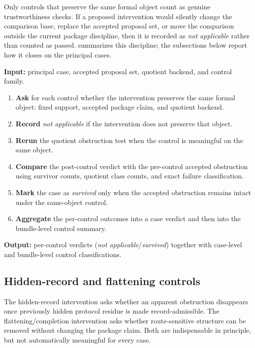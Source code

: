 \documentclass[11pt]{article}
\theoremstyle{definition}
\begin{document}
Only controls that preserve the same formal object count as genuine trustworthiness checks. If a proposed intervention would silently change the comparison base, replace the accepted proposal set, or move the comparison outside the current package discipline, then it is recorded as \emph{not applicable} rather than counted as passed.  summarizes this discipline; the subsections below report how it closes on the principal cases.

\begin{algorithm}[t]
    \caption{Flagship Control-Bundle Evaluation}
    \label{alg:control-bundle-workflow}
    \small
    \textbf{Input:} principal case, accepted proposal set, quotient backend, and control family. \par\smallskip
    \begin{enumerate}[leftmargin=1.8em,label=\arabic*.,itemsep=2pt,topsep=3pt]
        \item \textbf{Ask} for each control whether the intervention preserves the same formal object: fixed support, accepted package claim, and quotient backend.
        \item \textbf{Record} \emph{not applicable} if the intervention does not preserve that object.
        \item \textbf{Rerun} the quotient obstruction test when the control is meaningful on the same object.
        \item \textbf{Compare} the post-control verdict with the pre-control accepted obstruction using survivor counts, quotient class counts, and exact failure classification.
        \item \textbf{Mark} the case as \emph{survived} only when the accepted obstruction remains intact under the same-object control.
        \item \textbf{Aggregate} the per-control outcomes into a case verdict and then into the bundle-level control summary.
    \end{enumerate}
    \textbf{Output:} per-control verdicts (\emph{not applicable}/\emph{survived}) together with case-level and bundle-level control classifications.
\end{algorithm}

\subsection{Hidden-record and flattening controls}

The hidden-record intervention asks whether an apparent obstruction disappears once previously hidden protocol residue is made record-admissible. The flattening/completion intervention asks whether route-sensitive structure can be removed without changing the package claim. Both are indispensable in principle, but not automatically meaningful for every case.
\end{document}
